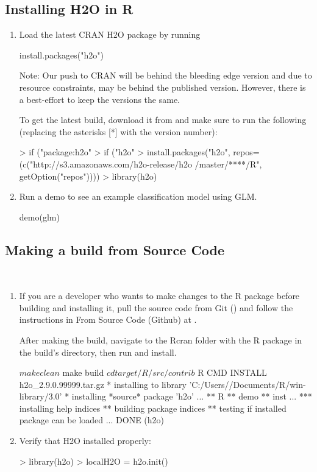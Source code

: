 \documentclass[11pt]{article}
\begin{document}
\subsection{Installing H2O in R}
\begin{enumerate}
\item Load the latest CRAN H2O package by running \begin{spverbatim} install.packages("h2o") \end{spverbatim} 

Note: Our push to CRAN will be behind the bleeding edge version and due to resource constraints, may be behind the published version. However, there is a best-effort to keep the versions the same. 

To get the latest build, download it from  and make sure to run the following (replacing the asterisks [*] with the version number): 
\begin{spverbatim}
> if ("package:h2o" %
> if ("h2o" %
> install.packages("h2o", repos=(c("http://s3.amazonaws.com/h2o-release/h2o
/master/****/R", getOption("repos"))))
> library(h2o)
\end{spverbatim}
\item Run a demo to see an example classification model using GLM. 
\begin{spverbatim}
demo(glm)
\end{spverbatim}
\end{enumerate}

\subsection{Making a build from Source Code} \begin{enumerate}
\item If you are a developer who wants to make changes to the R package before building and installing it, pull the source code from Git () and follow the instructions in From Source Code (Github) at .

After making the build, navigate to the Rcran folder with the R package in the build’s directory, then run and install.
\begin{spverbatim}
$ make clean
$ make build
$ cd target/R/src/contrib
$ R CMD INSTALL h2o_2.9.0.99999.tar.gz
* installing to library 'C:/Users//Documents/R/win-library/3.0'
* installing *source* package 'h2o' ...
** R
** demo
** inst
...
*** installing help indices
** building package indices
** testing if installed package can be loaded
...
DONE (h2o)
\end{spverbatim}


\item Verify that H2O installed properly:
\begin{spverbatim}

> library(h2o)
> localH2O = h2o.init()
\end{spverbatim}
\end{enumerate}
\end{document}
